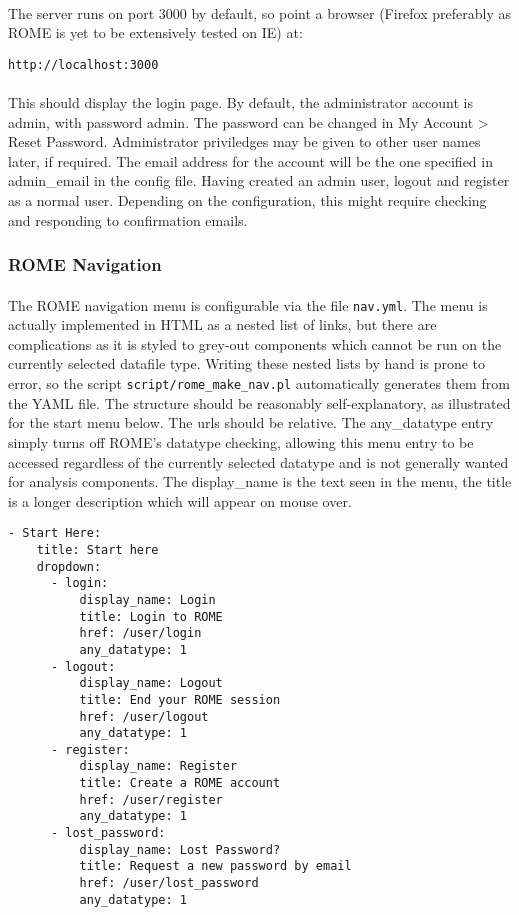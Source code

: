 \paragraph{}
The server runs on port 3000 by default, so point a browser (Firefox preferably as ROME is yet to be extensively tested on IE) at:

\begin{verbatim}
http://localhost:3000
\end{verbatim}

\paragraph{}
This should display the login page.  By default, the administrator account is admin, with password admin. The password can be changed in My Account > Reset Password. Administrator priviledges may be given to other user names later, if required. The email address for the account will be the one specified in admin\_email in the config file. Having created an admin user, logout and register as a normal user. Depending on the configuration, this might require checking and responding to confirmation emails.



\subsubsection{ROME Navigation}
\paragraph{}
The ROME navigation menu is configurable via the file \texttt{nav.yml}. The menu is actually implemented in HTML as a nested list of links, but there are complications as it is styled to grey-out components which cannot be run on the currently selected datafile type. Writing these nested lists by hand is prone to error, so the script \texttt{script/rome\_make\_nav.pl} automatically generates them from the YAML file. The structure should be reasonably self-explanatory, as illustrated for the start menu below. The urls should be relative. The any\_datatype entry simply turns off ROME's datatype checking, allowing this menu entry to be accessed regardless of the currently selected datatype and is not generally wanted for analysis components. The display\_name is the text seen in the menu, the title is a longer description which will appear on mouse over.

\begin{verbatim}
- Start Here:
    title: Start here
    dropdown:
      - login:
          display_name: Login
          title: Login to ROME
          href: /user/login
          any_datatype: 1
      - logout:
          display_name: Logout
          title: End your ROME session
          href: /user/logout
          any_datatype: 1
      - register:
          display_name: Register
          title: Create a ROME account
          href: /user/register
          any_datatype: 1
      - lost_password:
          display_name: Lost Password?
          title: Request a new password by email
          href: /user/lost_password
          any_datatype: 1
\end{verbatim}



